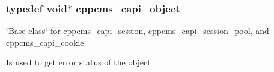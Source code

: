 \subsubsection[{cppcms\+\_\+capi\+\_\+object}]{\setlength{\rightskip}{0pt plus 5cm}typedef void$\ast$ {\bf cppcms\+\_\+capi\+\_\+object}}\label{group__capi__session__error__handling_ga98755159eeab676bf00261135dc307b2}
\char`\"{}\+Base class\char`\"{} for cppcms\+\_\+capi\+\_\+session, cppcms\+\_\+capi\+\_\+session\+\_\+pool, and cppcms\+\_\+capi\+\_\+cookie

Is used to get error status of the object 
